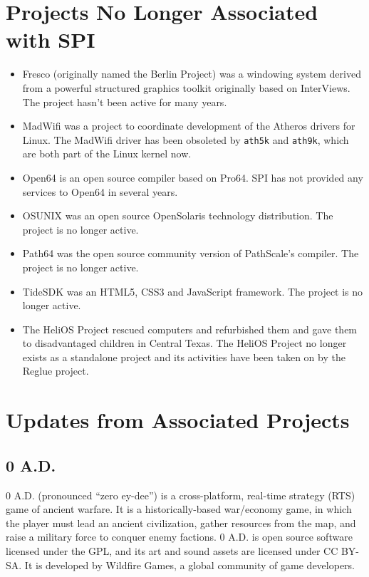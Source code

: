 \documentclass[a4paper]{report}
\begin{document}
\section{Projects No Longer Associated with SPI}

\begin{itemize}

\item Fresco (originally named the Berlin Project) was a windowing
system derived from a powerful structured graphics toolkit
originally based on InterViews.  The project hasn't been active
for many years.

\item MadWifi was a project to coordinate development of the Atheros
drivers for Linux.  The MadWifi driver has been obsoleted by
{\tt ath5k} and {\tt ath9k}, which are both part of the Linux kernel
now.

\item Open64 is an open source compiler based on Pro64.  SPI has not
provided any services to Open64 in several years.

\item OSUNIX was an open source OpenSolaris technology distribution.
The project is no longer active.

\item Path64 was the open source community version of PathScale's
compiler.  The project is no longer active.

\item TideSDK was an HTML5, CSS3 and JavaScript framework.  The
project is no longer active.

\item The HeliOS Project rescued computers and refurbished them and
gave them to disadvantaged children in Central Texas.  The HeliOS
Project no longer exists as a standalone project and its activities
have been taken on by the Reglue project.

\end{itemize}

\section{Updates from Associated Projects}

\subsection{0 A.D.}

0 A.D. (pronounced ``zero ey-dee'') is a cross-platform, real-time
strategy (RTS) game of ancient warfare. It is a historically-based
war/economy game, in which the player must lead an ancient civilization,
gather resources from the map, and raise a military force to conquer
enemy factions. 0 A.D. is open source software licensed under the GPL,
and its art and sound assets are licensed under CC BY-SA. It is
developed by Wildfire Games, a global community of game developers.
\end{document}
